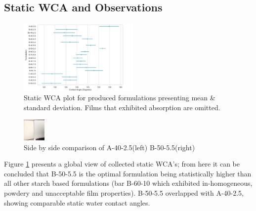 
\subsection{Static WCA and Observations}
\begin{figure}[h!]
\centering
  \includegraphics[width=0.523\textwidth]{Sections/Figures/StaticBlue2.png}
  \caption{Static WCA plot for produced formulations presenting mean  \& standard deviation. Films that exhibited absorption are omitted.}\label{CAs}
\end{figure} 

\begin{figure}
\centering
    \includegraphics[width=0.1\textwidth]{Sections/Figures/AandB.jpeg}

  \caption{Side by side comparison of A-40-2.5(left) B-50-5.5(right)}
  \label{Comp}
\end{figure}

Figure \ref{CAs} presents a global view of collected static WCA's; from here it can be concluded that B-50-5.5 is the optimal formulation being statistically higher than all other starch based formulations (bar B-60-10 which exhibited in-homogeneous, powdery and unacceptable film properties). B-50-5.5 overlapped with A-40-2.5, showing comparable static water contact angles.

